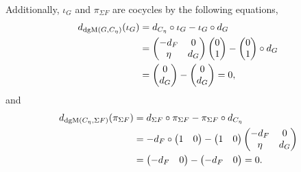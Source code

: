 \begin{remark}
    Additionally, \( \iota_G \) and \( \pi_{\Sigma F} \) are cocycles by the following equations,
    \begin{align*}
        d_{\operatorname{dgM}(G, C_{\eta})}(\iota_G) &= d_{C_{\eta}} \circ \iota_G - \iota_G \circ d_G \\
        &=
        \begin{pmatrix}
            -d_F & 0 \\
            \eta & d_G
        \end{pmatrix}
        \begin{pmatrix}
            0 \\
            1
        \end{pmatrix}
        -
        \begin{pmatrix}
            0 \\
            1
        \end{pmatrix}
        \circ d_G \\
        &=
        \begin{pmatrix}
            0 \\
            d_G
        \end{pmatrix}
        -
        \begin{pmatrix}
            0 \\
            d_G
        \end{pmatrix}
        = 0,
    \end{align*}
    and
    \begin{align*}
        d_{\operatorname{dgM}(C_{\eta}, \Sigma F)}(\pi_{\Sigma F}) &= d_{\Sigma F} \circ \pi_{\Sigma F} - \pi_{\Sigma F} \circ d_{C_{\eta}} \\
        &= -d_F \circ
        \begin{pmatrix}
            1 & 0
        \end{pmatrix}
        -
        \begin{pmatrix}
            1 & 0
        \end{pmatrix}
        \begin{pmatrix}
            -d_F & 0 \\
            \eta & d_G
        \end{pmatrix} \\
        &=
        \begin{pmatrix}
            -d_F & 0
        \end{pmatrix}
        -
        \begin{pmatrix}
            -d_F & 0
        \end{pmatrix}
        = 0.
    \end{align*}


\end{remark}
